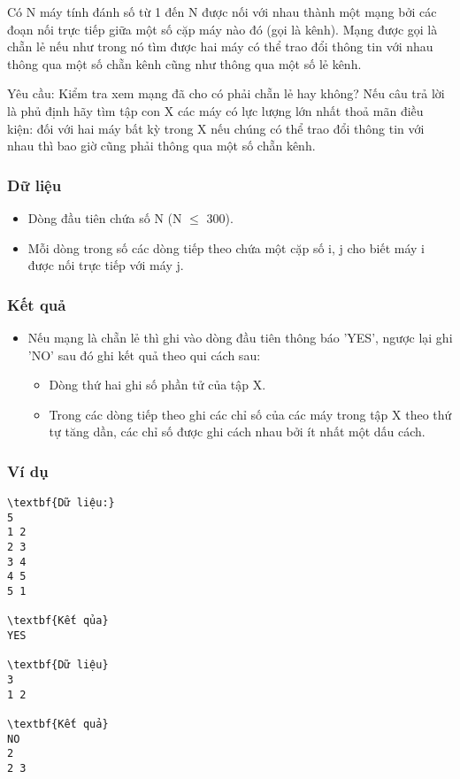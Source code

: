 



   Có N máy tính đánh số từ 1 đến N được nối với nhau thành một mạng bởi các đoạn nối trực tiếp giữa một số cặp máy nào đó (gọi là kênh). Mạng   được gọi là   chẵn lẻ   nếu như trong nó tìm được hai máy có thể trao đổi thông tin với nhau thông qua một số chẵn kênh cũng như thông qua một   số lẻ kênh.  

   Yêu cầu: Kiểm tra xem mạng đã cho có phải   chẵn lẻ   hay không? Nếu câu trả lời là phủ định hãy tìm tập con X các máy có lực lượng lớn   nhất thoả mãn điều kiện: đối với hai máy bất kỳ trong X nếu chúng có thể trao đổi thông tin với nhau thì bao giờ cũng phải thông qua một số chẵn kênh.  

\subsubsection{   Dữ liệu  }
\begin{itemize}
	\item     Dòng đầu tiên chứa số N (N $\le$ 300).   
	\item     Mỗi dòng trong số các dòng tiếp theo chứa một cặp số i, j cho biết máy i được nối trực tiếp với máy j.   
\end{itemize}

\subsubsection{   Kết quả  }
\begin{itemize}
	\item     Nếu mạng là    chẵn lẻ    thì ghi vào dòng đầu tiên thông báo 'YES', ngược lại ghi 'NO' sau đó ghi kết quả theo qui cách sau:    
\begin{itemize}
	\item       Dòng thứ hai ghi số phần tử của tập X.     
	\item       Trong các dòng tiếp theo ghi các chỉ số của các máy trong tập X theo thứ tự tăng dần, các chỉ số được ghi cách nhau bởi ít nhất một dấu cách.     
\end{itemize}
\end{itemize}

\subsubsection{   Ví dụ  }
\begin{verbatim}
\textbf{Dữ liệu:}
5
1 2
2 3
3 4
4 5
5 1

\textbf{Kết qủa}
YES

\textbf{Dữ liệu}
3 
1 2

\textbf{Kết quả}
NO
2
2 3
\end{verbatim}
